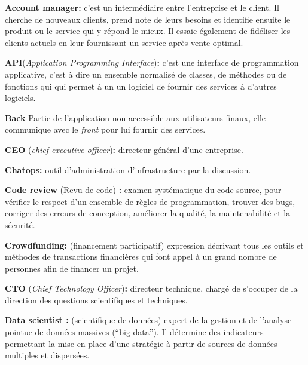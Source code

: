 \documentclass[12pt,a4paper]{article}
\begin{document}
  \textbf{Account manager:} c'est un intermédiaire entre l'entreprise et
  le client. Il cherche de nouveaux clients, prend note de leurs besoins
  et identifie ensuite le produit ou le service qui y répond le mieux. Il
  essaie également de fidéliser les clients actuels en leur fournissant un
  service après-vente optimal.

  \bigskip

  \textbf{API}(\emph{Application Programming Interface})\textbf{:} c'est
  une interface de programmation applicative, c'est à dire un ensemble
  normalisé de classes, de méthodes ou de fonctions qui qui permet à un un
  logiciel de fournir des services à d'autres logiciels.

  \bigskip

  \textbf{Back} Partie de l'application non accessible aux utilisateurs
  finaux, elle communique avec le \emph{front} pour lui fournir des
  services.

  \bigskip

  \textbf{CEO} (\emph{chief executive officer})\textbf{:} directeur
  général d'une entreprise.

  \bigskip

  \textbf{Chatops:} outil d'administration d'infrastructure par la
  discussion.

  \bigskip

  \textbf{Code review} (Revu de code) \textbf{:} examen systématique du
  code source, pour vérifier le respect d'un ensemble de règles de
  programmation, trouver des bugs, corriger des erreurs de conception,
  améliorer la qualité, la maintenabilité et la sécurité.

  \bigskip

  \textbf{Crowdfunding:} (financement participatif) expression décrivant
  tous les outils et méthodes de transactions financières qui font appel à
  un grand nombre de personnes afin de financer un projet.

  \bigskip

  \textbf{CTO} (\emph{Chief Technology Officer})\textbf{:} directeur
  technique, chargé de s'occuper de la direction des questions
  scientifiques et techniques.

  \bigskip

  \textbf{Data scientist :} (scientifique de données) expert de la gestion
  et de l'analyse pointue de données massives (``big data''). Il détermine
  des indicateurs permettant la mise en place d'une stratégie à partir de
  sources de données multiples et dispersées.
\end{document}
